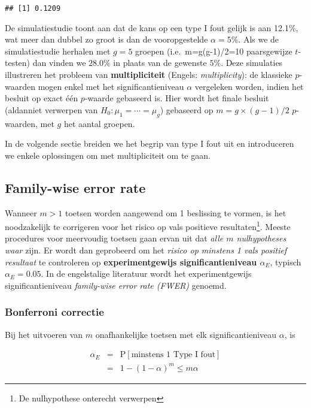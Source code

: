 \documentclass[
  12pt,dutch,coursenotes]{book}
\theoremstyle{definition}
\theoremstyle{definition}
\theoremstyle{definition}
\theoremstyle{remark}
\begin{document}
\begin{verbatim}
## [1] 0.1209
\end{verbatim}

De simulatiestudie toont aan dat de kans op een type I fout gelijk is aan 12.1\%, wat meer dan dubbel zo groot is dan de vooropgestelde \(\alpha=5\%\).
Als we de simulatiestudie herhalen met \(g=5\) groepen (i.e.~m=g(g-1)/2=10 paarsgewijze \(t\)-testen) dan vinden we \(28.0\%\) in plaats van de gewenste \(5\%\).
Deze simulaties illustreren het probleem van \textbf{multipliciteit} (Engels: \emph{multiplicity}): de klassieke \(p\)-waarden mogen enkel met het significantieniveau \(\alpha\) vergeleken worden, indien het besluit op exact één \(p\)-waarde gebaseerd is. Hier wordt het finale besluit (aldanniet verwerpen van \(H_0: \mu_1=\cdots =\mu_g\)) gebaseerd op \(m=g\times(g-1)/2\) \(p\)-waarden, met \(g\) het aantal groepen.

In de volgende sectie breiden we het begrip van type I fout uit en introduceren we enkele oplossingen om met multipliciteit om te gaan.

\hypertarget{family-wise-error-rate}{%
\subsection{Family-wise error rate}\label{family-wise-error-rate}}

Wanneer \(m>1\) toetsen worden aangewend om 1 beslissing te vormen, is het noodzakelijk te corrigeren voor het risico op vals positieve resultaten\footnote{De nulhypothese onterecht verwerpen}.
Meeste procedures voor meervoudig toetsen gaan ervan uit dat \emph{alle \(m\) nulhypotheses waar} zijn.
Er wordt dan geprobeerd om het \emph{risico op minstens 1 vals positief resultaat} te controleren op \textbf{experimentgewijs significantieniveau \(\alpha_E\)}, typisch \(\alpha_E=0.05\). In de engelstalige literatuur wordt het experimentgewijs significantieniveau \emph{family-wise error rate (FWER)} genoemd.

\hypertarget{bonferroni-correctie}{%
\subsubsection{Bonferroni correctie}\label{bonferroni-correctie}}

Bij het uitvoeren van \(m\) onafhankelijke toetsen met elk significantieniveau \(\alpha\), is

\begin{eqnarray*}
\alpha_E&=&\text{P}[\text{minstens 1 Type I fout}]\\
&=&1-(1-\alpha)^m \leq m\alpha
\end{eqnarray*}
\end{document}
